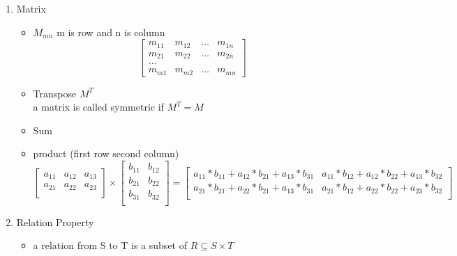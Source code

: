 \documentclass[11pt, a4paper]{article}
\begin{document}
\begin{enumerate}
        \item Matrix
            \begin{itemize}
                \item $M_{mn}$ m is row and n is column
                \[
                    \begin{bmatrix}
                        m_{11}  &  m_{12}  &  \dots  &  m_{1n}\\
                        m_{21}  &  m_{22}  &  \dots  &  m_{2n}\\
                        \dots\\
                        m_{m1}  &  m_{m2}  &  \dots  &  m_{mn}
                    \end{bmatrix}
                \]
                \item Transpose $M^{T}$\\
                a matrix is called symmetric if $M^T = M$
                \item Sum
                \item product (first row second column)
                \[
                    \begin{bmatrix}
                        a_{11}  &  a_{12}   &  a_{13}\\
                        a_{21}  &  a_{22}   &  a_{23}\\
                    \end{bmatrix}
                    \times
                    \begin{bmatrix}
                        b_{11}  &  b_{12}\\
                        b_{21}  &  b_{22}\\
                        b_{31}  &  b_{32}\\
                    \end{bmatrix}
                    =
                    \begin{bmatrix}
                        a_{11}*b_{11}+a_{12}*b_{21}+a_{13}*b_{31}  &  a_{11}*b_{12}+a_{12}*b_{22}+a_{13}*b_{32}\\
                        a_{21}*b_{21}+a_{22}*b_{21}+a_{13}*b_{31}  &  a_{21}*b_{12}+a_{22}*b_{22}+a_{23}*b_{32}\\
                    \end{bmatrix}
                \]
            \end{itemize}
        \item Relation Property
            \begin{itemize}
                \item a relation from S to T is a subset of $R \subseteq S \times T$

\end{itemize}
\end{enumerate}
\end{document}
